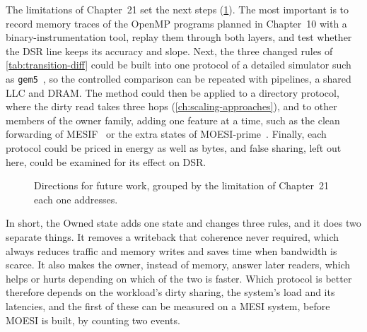 The limitations of Chapter~21 set the next steps (\cref{fig:conc-future}). The most
important is to record memory traces of the OpenMP programs planned in Chapter~10
with a binary-instrumentation tool, replay them through both layers, and test
whether the DSR line keeps its accuracy and slope. Next, the three changed rules of
\cref{tab:transition-diff} could be built into one protocol of a detailed simulator
such as \texttt{gem5}~\cite{binkert2011gem5}, so the controlled comparison can be
repeated with pipelines, a shared LLC and DRAM. The method could then be applied to
a directory protocol, where the dirty read takes three hops
(\cref{ch:scaling-approaches}), and to other members of the owner family, adding one
feature at a time, such as the clean forwarding of MESIF~\cite{goodman2009mesif} or
the extra states of MOESI-prime~\cite{loughlin2022moesiprime}. Finally, each protocol
could be priced in energy as well as bytes, and false sharing, left out here, could
be examined for its effect on DSR.

\begin{figure}[htbp]
\centering
{}
\caption[Future work]{Directions for future work, grouped by the limitation of
Chapter~21 each one addresses.}
\label{fig:conc-future}
\end{figure}

In short, the Owned state adds one state and changes three rules, and it does two
separate things. It removes a writeback that coherence never required, which always
reduces traffic and memory writes and saves time when bandwidth is scarce. It also
makes the owner, instead of memory, answer later readers, which helps or hurts
depending on which of the two is faster. Which protocol is better therefore depends
on the workload's dirty sharing, the system's load and its latencies, and the first
of these can be measured on a MESI system, before MOESI is built, by counting two
events.
